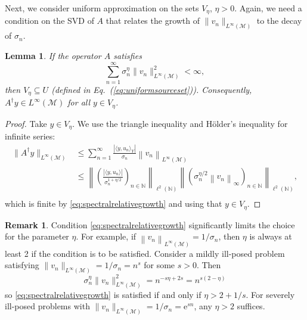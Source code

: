 \documentclass{article}
\newtheorem{lemma}[theorem]{Lemma}
\theoremstyle{definition}
\newtheorem{remark}[theorem]{Remark}
\newcommand{\N}{\mathbb{N}}
\newcommand{\expon}[1]{\mathrm{e}^{#1}}
\newcommand{\smallnorm}[1]{\lVert#1\rVert}
\newcommand{\norm}[1]{\left\lVert#1\right\rVert}
\newcommand{\abs}[1]{\left\lvert#1\right\rvert}
\newcommand{\pseudoinv}[1]{{#1}^\dagger}
\begin{document}
Next, we consider uniform approximation on the sets \(V_\eta\), \(\eta>0\).
Again, we need a condition on the SVD of \(A\)
that relates
the growth of \(\smallnorm{v_n}_{L^\infty(\mathcal{M})}\) to 
the decay of \(\sigma_n\).

\begin{lemma}
\label{thm:uniformpicard}
    If the operator \(A\) satisfies
    \begin{equation}
        \label{eq:spectralrelativegrowth}
        \sum_{n=1}^\infty
        \sigma_n^{\eta} \smallnorm{v_n}_{L^\infty(\mathcal{M})}^2
        < \infty,
    \end{equation}
    then \(V_\eta\subseteq U\) (defined in Eq.~(\ref{eq:uniformsourceset})).
    Consequently, \(\pseudoinv{A}y\in L^\infty(\mathcal{M})\)
    for all \(y\in V_\eta\). 
\end{lemma}
\begin{proof}
   Take $y\in V_\eta$. We use the triangle inequality and H\"older's inequality for infinite series:
    \begin{align*}
        \smallnorm{\pseudoinv{A}y}_{L^\infty(\mathcal{M})}
        &\leq
        \sum_{n=1}^\infty
        \frac{\abs{\langle y, u_n\rangle_Y}}{\sigma_n}\norm{v_n}_{L^\infty(\mathcal{M})}
        \\
        &\leq
        \norm{
        \left(
        \frac{\abs{\langle y, u_n\rangle}}{\sigma_n^{1+\eta/2}}
        \right)_{n\in\N}
        }_{\ell^2(\N)}
        \norm{
        \left(
        \sigma_n^{\eta/2}\norm{v_n}_\infty
        \right)_{n\in\N}}_{\ell^2(\N)},\\
    \end{align*}
    which is finite by 
    \eqref{eq:spectralrelativegrowth} and using that \(y\in V_\eta\).
\end{proof}

\begin{remark}
    Condition \eqref{eq:spectralrelativegrowth}
    significantly limits the choice for the parameter \(\eta\).
    For example, if \(\norm{v_n}_{L^\infty(\mathcal{M})}=1/\sigma_n\), then \(\eta\) is always at least 2 if the condition is to be satisfied.
    Consider a mildly ill-posed problem satisfying
    \(\smallnorm{v_n}_{L^\infty(\mathcal{M})}=1/\sigma_n = n^s\) for some \(s>0\).
    Then 
    \begin{equation*}
        \sigma_n^\eta
        \smallnorm{v_n}_{L^\infty(\mathcal{M})}^2
        =
        n^{-s\eta+2s}
        =
        n^{s(2-\eta)}
    \end{equation*}
    so \eqref{eq:spectralrelativegrowth} is satisfied if and only if \(\eta>2+1/s\).
    For severely ill-posed problems with \(\smallnorm{v_n}_{L^\infty(\mathcal{M})}=1/\sigma_n = \expon{sn}\),
    any \(\eta>2\) suffices.
\end{remark}
\end{document}
